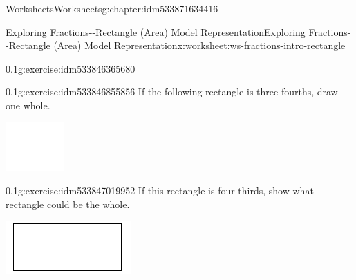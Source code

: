 \documentclass[twoside,11pt,]{book}
\begin{document}
\begin{chapterptx}{Worksheets}{}{Worksheets}{}{}{g:chapter:idm533871634416}
\begin{worksheet-section-numberless}{Exploring Fractions-{}-{}Rectangle (Area) Model Representation}{}{Exploring Fractions-{}-{}Rectangle (Area) Model Representation}{}{}{x:worksheet:ws-fractions-intro-rectangle}
\begin{divisionexercise}{2}{}{0.1}{g:exercise:idm533846365680}
\begin{sidebyside}{1}{0.3}{0.3}{0}
\begin{sbspanel}{0.4}
\end{sbspanel}%
\end{sidebyside}%
%
\end{divisionexercise}%
\begin{divisionexercise}{3}{}{0.1}{g:exercise:idm533846855856}%
If the following rectangle is three-fourths, draw one whole. \begin{sidebyside}{1}{0.35}{0.35}{0}%
\begin{sbspanel}{0.3}%
\includegraphics[width=1\linewidth]{images/generic-square.png}
\end{sbspanel}%
\end{sidebyside}%
%
\end{divisionexercise}%
\clearpage
\begin{divisionexercise}{4}{}{0.1}{g:exercise:idm533847019952}%
If this rectangle is four-thirds, show what rectangle could be the whole. \begin{sidebyside}{1}{0.3}{0.3}{0}%
\begin{sbspanel}{0.4}%
\includegraphics[width=1\linewidth]{images/generic-rectangle.png}

\end{sbspanel}
\end{sidebyside}
\end{divisionexercise}
\end{worksheet-section-numberless}
\end{chapterptx}
\end{document}
